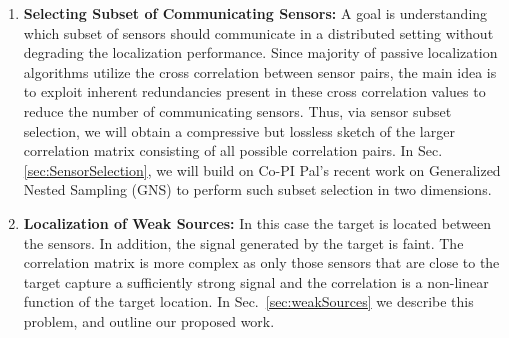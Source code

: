 \begin{enumerate}
\item {\bf Selecting Subset of Communicating Sensors:} A goal  is understanding which subset of sensors should communicate  in a distributed setting without degrading the localization performance. Since majority of passive localization algorithms utilize the cross correlation between sensor pairs, the main idea  is to exploit inherent redundancies present in these cross correlation values to reduce the number of communicating sensors. Thus, via sensor subset selection, we will obtain a compressive but lossless sketch of the larger correlation matrix consisting of all possible correlation pairs. In Sec. \ref{sec:SensorSelection}, we will build on Co-PI Pal's recent work on Generalized Nested Sampling (GNS) to perform such subset selection in two dimensions.
\item {\bf Localization of Weak Sources:}  In this case the target is located between the sensors. In addition, the signal generated by the target is faint. The correlation matrix is more complex as only those sensors that are close to the target capture a sufficiently strong signal and the correlation is a non-linear function of the target location. In Sec.~\ref{sec:weakSources} we describe  this problem, and outline our proposed work.

\end{enumerate}

